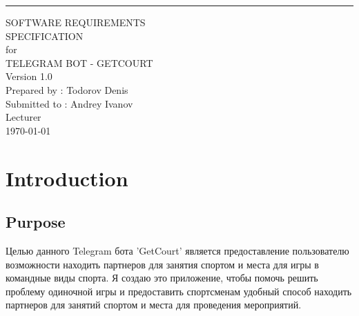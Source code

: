 \documentclass{scrreprt}
\date{}
\def\myversion{1.0 }
\begin{document}
\begin{flushright}
    \rule{16cm}{5pt}\vskip1cm
    \begin{bfseries}
        \Huge{SOFTWARE REQUIREMENTS\\ SPECIFICATION}\\
        \vspace{1.5cm}
        for\\
        \vspace{1.5cm}
        TELEGRAM BOT - GETCOURT\\
        \vspace{1.5cm}
        \LARGE{Version \myversion}\\
        \vspace{1.5cm}
        Prepared by : Todorov Denis\\
        \vspace{1.5cm}
        Submitted to : Andrey Ivanov \\Lecturer\\
        \vspace{1.5cm}
        \today\\
    \end{bfseries}
\end{flushright}

\tableofcontents

\chapter{Introduction}

\section{Purpose}
Целью данного Telegram бота 'GetCourt' является предоставление пользователю возможности находить партнеров для занятия спортом и места для игры в командные виды спорта. Я создаю это приложение, чтобы помочь решить проблему одиночной игры и предоставить спортсменам удобный способ находить партнеров для занятий спортом и места для проведения мероприятий.
\end{document}
